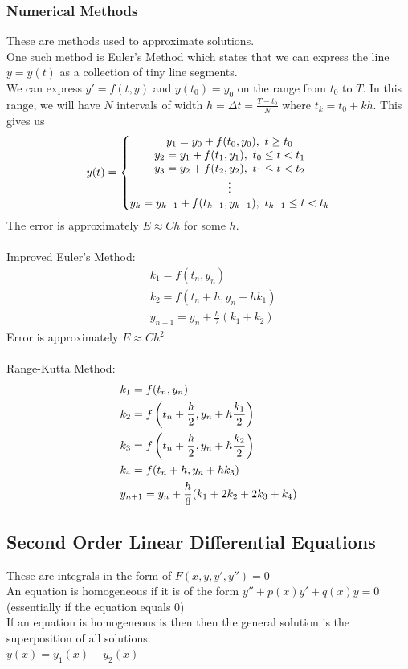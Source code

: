 \documentclass[11pt, fleqn]{article}
\begin{document}
\subsubsection{Numerical Methods}
These are methods used to approximate solutions.\\
One such method is Euler's Method which states that we can express the line $y=y(t)$ as a collection of tiny line segments.\\
We can express $y'=f(t,y)$ and $y(t_0)=y_0$ on the range from $t_0$ to $T$. In this range, we will have $N$ intervals of width $h=\Delta t=\frac{T-t_0}{N}$ where $t_k=t_0+kh$. This gives us
$$y(t)=\left\{\begin{matrix} y_1=y_0+f(t_0,y_0),\ t\geq t_0\\
y_2=y_1+f(t_1,y_1),\ t_0\leq t< t_1\\
y_3=y_2+f(t_2,y_2),\ t_1\leq t<t_2\\
\vdots\\
y_k=y_{k-1}+f(t_{k-1},y_{k-1}),\ t_{k-1}\leq t<t_k \end{matrix}\right.$$
The error is approximately $E\approx Ch$ for some $h$.\\
\\
Improved Euler's Method:
\begin{align*}
    &k_1=f(t_n,y_n)\\
    &k_2=f(t_n+h,y_n+hk_1)\\
    &y_{n+1}=y_n+\frac{h}{2}(k_1+k_2)
\end{align*}
Error is approximately $E\approx Ch^2$\\
\\
Range-Kutta Method:
\begin{align*}
    &k_1=f(t_n,y_n)\\
    &k_2=f\left( t_n+\frac{h}{2},y_n+h\frac{k_1}{2} \right)\\
    &k_3=f\left( t_n+\frac{h}{2},y_n+h\frac{k_2}{2} \right)\\
    &k_4=f(t_n+h,y_n+hk_3)\\
    &y_{n+1}=y_n+\frac{h}{6}(k_1+2k_2+2k_3+k_4)
\end{align*}




















\subsection{Second Order Linear Differential Equations}
These are integrals in the form of $F(x,y,y',y'')=0$\\
An equation is homogeneous if it is of the form $y''+p(x)y'+q(x)y=0$ (essentially if the equation equals 0)\\
If an equation is homogeneous is then then the general solution is the superposition of all solutions.\\
$y(x)=y_1(x)+y_2(x)$
\end{document}
